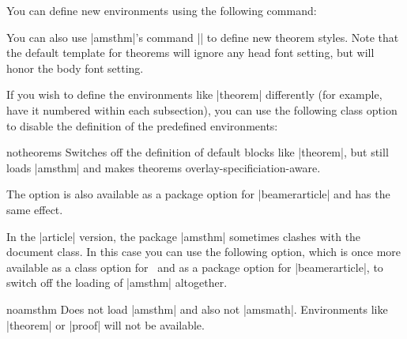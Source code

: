 You can define new environments using the following command:


You can also use |amsthm|'s command |\newtheoremstyle| to define new
theorem styles. Note that the default template for theorems will
ignore any head font setting, but will honor the body font setting.

If you wish to define the environments like |theorem| differently (for
example, have it numbered within each subsection), you can use the
following class option to disable the definition of the predefined
environments: 

\begin{classoption}{notheorems}
  Switches off the definition of default blocks like |theorem|, but
  still loads |amsthm| and makes theorems  
  overlay-specificiation-aware.
\end{classoption}

The option is also available as a package option for
|beamerarticle| and has the same effect.

\articlenote
In the |article| version, the package |amsthm| sometimes clashes with
the document class. In this case you can use the following option,
which is once more available as a class option for \beamer\ and as a
package option for |beamerarticle|, to switch off the loading of
|amsthm| altogether. 

\begin{classoption}{noamsthm}
  Does not load |amsthm| and also not |amsmath|. Environments like
  |theorem| or |proof| will not be available.
\end{classoption}



